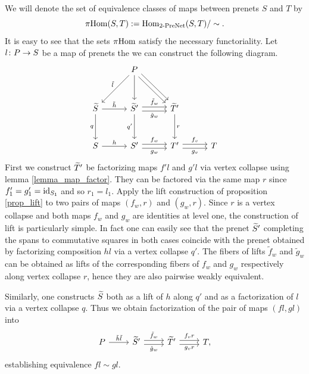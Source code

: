 \documentclass[letterpaper,12pt,leqno]{article}
\numberwithin{equation}{theorem}
\def\PreNet{\textrm{-}\mathrm{PreNet}}
\begin{document}
We will denote the set of equivalence classes of maps between prenets $S$ and $T$ by
$$
\pi\Hom(S, T) := \Hom_{2\PreNet}(S, T) / \sim.
$$
It is easy to see that the sets $\pi\mathrm{Hom}$ satisfy the necessary functoriality. Let $l\colon P \to S$ be a map of prenets the we can construct the following diagram.
\begin{equation}
\label{equ_piHom_pull}
\begin{tikzcd}[sep=3em]
& P \ar[dl, "\tilde l"'] \ar[d] \ar[shift left, dr] \ar[shift right, dr] && \\
\wtilde S \ar[d, "q"'] \ar[r, "\tilde h"] & \wtilde S' \ar[d, "q'"'] \ar[shift left, r, "\tilde f_w"] \ar[shift right, r, "\tilde g_w"'] & \wtilde T' \ar[d, "r"] & \\
S \ar[r, "h"] & S' \ar[shift left, r, "f_w"] \ar[shift right, r, "g_w"'] & T' \ar[shift left, r, "f_v"] \ar[shift right, r, "g_v"'] & T
\end{tikzcd}
\end{equation}
First we construct $\widetilde T'$ be factorizing maps $f'l$ and $g'l$ via vertex collapse using lemma \ref{lemma_map_factor}. They can be factored via the same map $r$ since
$f'_1 = g'_1 = \mathrm{id}_{S_1}$ and so $r_1 = l_1$. Apply the lift construction of proposition \ref{prop_lift} to two pairs of maps $(f_w, r)$ and $(g_w, r)$. Since $r$ is a vertex
collapse and both maps $f_w$ and $g_w$ are identities at level one, the construction of lift is particularly simple. In fact one can easily see that the prenet $\widetilde S'$
completing the spans to commutative squares in both cases coincide with the prenet obtained by factorizing composition $hl$ via a vertex collapse $q'$.
The fibers of lifts $\tilde f_w$ and $\tilde g_w$ can be obtained as lifts of the corresponding fibers of $f_w$ and $g_w$ respectively along vertex collapse $r$, hence they
are also pairwise weakly equivalent.

Similarly, one constructs $\widetilde S$ both as a lift of $h$ along $q'$ and as a factorization of $l$ via a vertex collapse $q$. Thus we obtain factorization of the pair of maps $(fl, gl)$ into
$$
\begin{tikzcd}
P \ar[r, "\tilde h \tilde l"] & \wtilde S' \ar[shift left, r, "\tilde f_w"] \ar[shift right, r, "\tilde g_w"'] & \wtilde T' \ar[shift left, r, "f_v r"] \ar[shift right, r, "g_v r"'] & T,
\end{tikzcd}
$$
establishing equivalence $fl \sim gl$.
\end{document}
